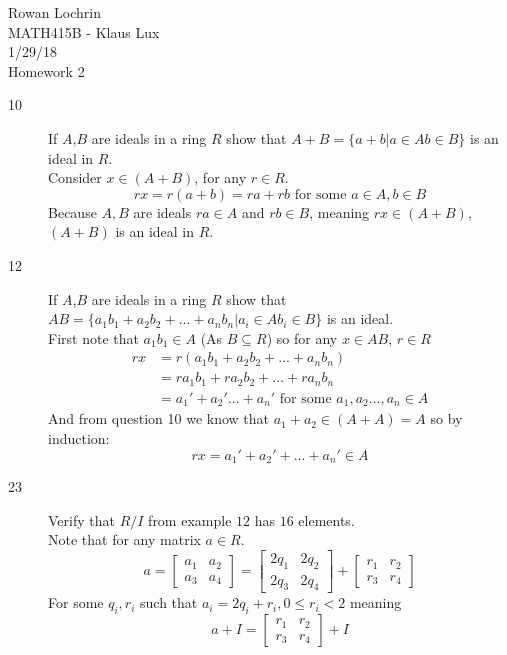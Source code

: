 \documentclass[11pt]{article}
\begin{document}
\begin{flushleft}
	Rowan Lochrin \\
	MATH415B - Klaus Lux \\
	1/29/18 \\
	Homework 2
\end{flushleft}
\begin{description}
	\item[10] If $A$,$B$ are ideals in a ring $R$ show that $A+B = \{a+b|a\in A b \in
	B \}$ is an ideal in $R$.\\
	Consider $x \in (A+B)$, for any $r \in R$.
		$$ rx = r(a+b) = ra + rb \text{ for some } a \in A, b \in B$$
		Because $A,B$ are ideals $ra \in A$ and $rb \in B$, meaning $rx
		\in (A+B)$,  $(A+B)$ is an ideal in $R$.

	\item[12] If $A$,$B$ are ideals in a ring $R$ show that $AB = \{a_1b_1 +
		a_2b_2 +...+a_nb_n |a_i\in A b_i \in B\}$ is an ideal.\\
		First note that $a_1b_1 \in A$ (As $B \subseteq R$) so for any
		$x \in AB$, $r \in R$
		\begin{align*}
			rx & = r(a_1b_1 + a_2b_2 +...+a_nb_n) \\
			   & = ra_1b_1 + ra_2b_2 +...+ra_nb_n \\
			   & = a_1' + a_2' ... + a_n' \text { for some }
			   a_1,a_2...,a_n \in A
		\end{align*}
		And from question 10 we 
		know that $a_1 + a_2 \in (A+A) = A$ so by induction:
			$$ rx = a_1' + a_2'+ ... + a_n' \in A$$
	\item[23] Verify that $R/I$ from example $12$ has $16$ elements.\\
		Note that for any matrix $a \in R$.
		$$ a = \begin{bmatrix} a_1 & a_2 \\ a_3 & a_4 \end{bmatrix} =
		 \begin{bmatrix} 2q_1 & 2q_2 \\ 2q_3 & 2q_4 \end{bmatrix} +
		 \begin{bmatrix} r_1 & r_2 \\ r_3 & r_4 \end{bmatrix} $$
			 For some $q_i,r_i $ such that $a_i = 2q_i + r_i, 0 \leq r_i < 2$
			 meaning $$ a + I =  
		 \begin{bmatrix} r_1 & r_2 \\ r_3 & r_4 \end{bmatrix} + I $$

\end{description}
\end{document}
